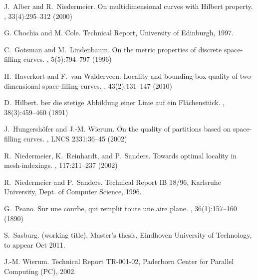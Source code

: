 \documentclass[11pt,a4paper]{article}
\begin{document}
\begin{thebibliography}{10}

J.~Alber and R.~Niedermeier.
\newblock On multidimensional curves with {H}ilbert property.
, 33(4):295--312 (2000)

G. Chochia and M. Cole.
\newblock Technical Report, University of Edinburgh, 1997.

C.~Gotsman and M.~Lindenbaum.
\newblock On the metric properties of discrete space-filling curves.
, 5(5):794--797 (1996)

H.~Haverkort and F.~van Walderveen.
\newblock Locality and bounding-box quality of two-dimensional space-filling curves.
, 43(2):131--147 (2010)

D.~Hilbert.
ber die stetige {A}bbildung einer {L}inie auf ein
  {F}l{\"a}chenst{\"u}ck.
, 38(3):459--460 (1891)

J.~Hungersh{\"o}fer and J.-M. Wierum.
\newblock On the quality of partitions based on space-filling curves.
, LNCS 2331:36--45 (2002)

R.~Niedermeier, K.~Reinhardt, and P.~Sanders.
\newblock Towards optimal locality in mesh-indexings.
, 117:211--237 (2002)

R.~Niedermeier and P.~Sanders.
\newblock Technical Report IB 18/96, Karlsruhe University, Dept. of Computer
  Science, 1996.

G.~Peano.
\newblock Sur une courbe, qui remplit toute une aire plane.
, 36(1):157--160 (1890)

S.~Sasburg.
 (working title).
\newblock Master's thesis, Eindhoven University of Technology, to appear Oct 2011.

J.-M. Wierum.
\newblock Technical Report TR-001-02, Paderborn Center for Parallel Computing
  (PC), 2002.

\end{thebibliography}
\end{document}
